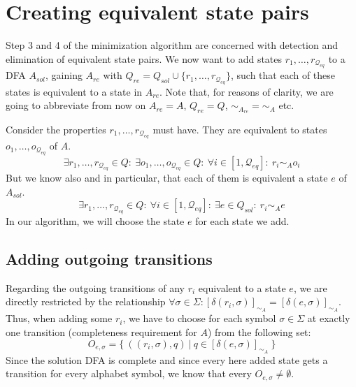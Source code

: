 \section{Creating equivalent state pairs}

Step 3 and 4 of the minimization algorithm are concerned with detection and elimination of equivalent state pairs. We now want to add states $r_1,\ldots,r_{\mathcal{Q}_{eq}}$ to a DFA $A_{sol}$, gaining $A_{re}$ with $Q_{re} = Q_{sol} \cup \{r_1,\ldots,r_{\mathcal{Q}_{eq}}\}$, such that each of these states is equivalent to a state in $A_{re}$. Note that, for reasons of clarity, we are going to abbreviate from now on $A_{re} = A$, $Q_{re} = Q$, $\sim_{A_{re}} = \sim_A$ etc.


Consider the properties $r_1,\ldots,r_{\mathcal{Q}_{eq}}$ must have. They are equivalent to states $o_1,\ldots,o_{\mathcal{Q}_{eq}}$ of $A$.
\[
\exists r_1,\ldots,r_{\mathcal{Q}_{eq}} \in Q\colon\ \exists o_1,\ldots,o_{\mathcal{Q}_{eq}} \in Q\colon\ \forall i \in [1,\mathcal{Q}_{eq}] \colon\ r_i \sim_A o_i
\]
But we know also and in particular, that each of them is equivalent a state $e$ of $A_{sol}$.
\[
	\exists r_1,\ldots,r_{\mathcal{Q}_{eq}} \in Q\colon\ \forall i \in [1,\mathcal{Q}_{eq}] \colon\ \exists e \in Q_{sol}\colon\ r_i \sim_A e
\]
In our algorithm, we will choose the state $e$ for each state we add.

\subsection{Adding outgoing transitions}

Regarding the outgoing transitions of any $r_i$ equivalent to a state $e$, we are directly restricted by the relationship $\forall \sigma \in \Sigma \colon [\delta(r_i, \sigma)]_{\sim_A} = [\delta(e, \sigma)]_{\sim_A}$. Thus, when adding some $r_i$, we have to choose for each symbol $\sigma \in \Sigma$ at exactly one transition (completeness requirement for $A$) from the following set:
\[
	O_{e,\sigma} = \{\ ((r_i, \sigma), q)\ |\ q \in [\delta(e, \sigma)]_{\sim_A}\ \}
\]
Since the solution DFA is complete and since every here added state gets a transition for every alphabet symbol, we know that every $O_{e,\sigma} \neq \emptyset$.


